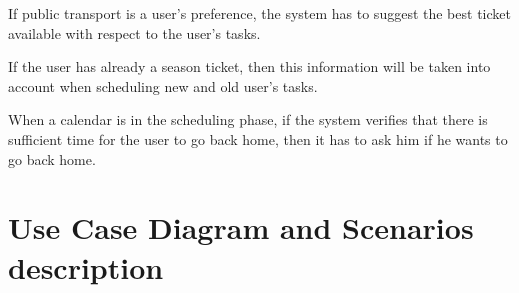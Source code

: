 \begin{requirementList}
    \item If public transport is a user's preference, the system has to suggest the best ticket available with respect to the user's tasks. 
    \begin{enumerate}[label={[}R 18.\arabic*{]}:]
    \item If the user has already a season ticket, then this information will be taken into account when scheduling new and old user's tasks.
    \end{enumerate}
    
    \item When a calendar is in the scheduling phase, if the system verifies that there is sufficient time for the user to go back home, then it has to ask him if he wants to go back home.

\end{requirementList}

\section{Use Case Diagram and Scenarios description}








